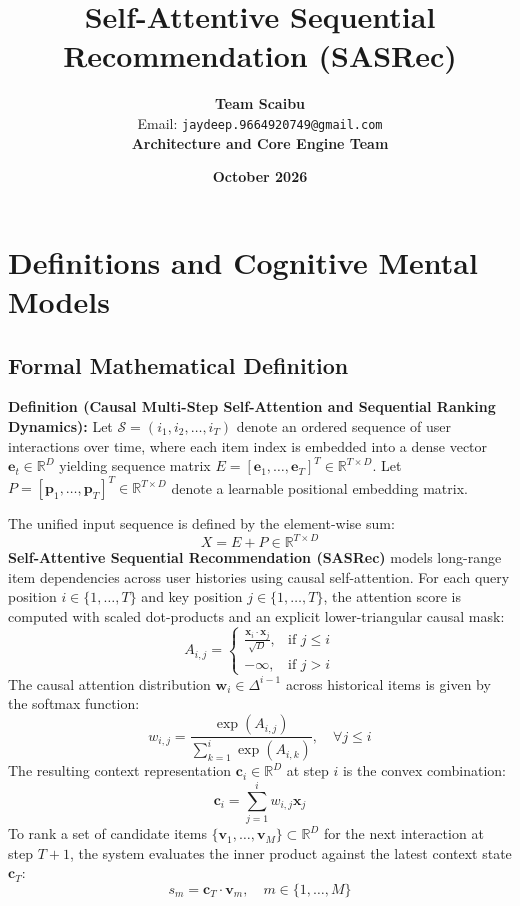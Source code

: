 \documentclass[11pt,a4paper]{article}
\title{\textbf{Self-Attentive Sequential Recommendation (SASRec)}}
\author{\textbf{Team Scaibu} \\ \small Email: \texttt{jaydeep.9664920749@gmail.com} \\ \small \textbf{Architecture and Core Engine Team}}
\date{\textbf{October 2026}}
\theoremstyle{definition}
\begin{document}
\maketitle

\section{Definitions and Cognitive Mental Models}

\subsection{Formal Mathematical Definition}
\textbf{Definition (Causal Multi-Step Self-Attention and Sequential Ranking Dynamics):}
Let $\mathcal{S} = (i_1, i_2, \dots, i_T)$ denote an ordered sequence of user interactions over time, where each item index is embedded into a dense vector $\mathbf{e}_t \in \mathbb{R}^D$ yielding sequence matrix $E = [\mathbf{e}_1, \dots, \mathbf{e}_T]^T \in \mathbb{R}^{T \times D}$. Let $P = [\mathbf{p}_1, \dots, \mathbf{p}_T]^T \in \mathbb{R}^{T \times D}$ denote a learnable positional embedding matrix.

The unified input sequence is defined by the element-wise sum:
{\boldmath
\begin{equation}
X = E + P \in \mathbb{R}^{T \times D}
\end{equation}
}
\textbf{Self-Attentive Sequential Recommendation (SASRec)} models long-range item dependencies across user histories using causal self-attention. For each query position $i \in \{1, \dots, T\}$ and key position $j \in \{1, \dots, T\}$, the attention score is computed with scaled dot-products and an explicit lower-triangular causal mask:
{\boldmath
\begin{equation}
A_{i, j} = 
\begin{cases}
\frac{\mathbf{x}_i \cdot \mathbf{x}_j}{\sqrt{D}}, & \text{if } j \le i \\
-\infty, & \text{if } j > i
\end{cases}
\end{equation}
}
The causal attention distribution $\mathbf{w}_i \in \Delta^{i-1}$ across historical items is given by the softmax function:
{\boldmath
\begin{equation}
w_{i, j} = \frac{\exp\left( A_{i, j} \right)}{\sum_{k=1}^i \exp\left( A_{i, k} \right)}, \quad \forall j \le i
\end{equation}
}
The resulting context representation $\mathbf{c}_i \in \mathbb{R}^D$ at step $i$ is the convex combination:
{\boldmath
\begin{equation}
\mathbf{c}_i = \sum_{j=1}^i w_{i, j} \mathbf{x}_j
\end{equation}
}
To rank a set of candidate items $\{\mathbf{v}_1, \dots, \mathbf{v}_M\} \subset \mathbb{R}^D$ for the next interaction at step $T+1$, the system evaluates the inner product against the latest context state $\mathbf{c}_T$:
{\boldmath
\begin{equation}
s_m = \mathbf{c}_T \cdot \mathbf{v}_m, \quad m \in \{1, \dots, M\}
\end{equation}
}
\end{document}
